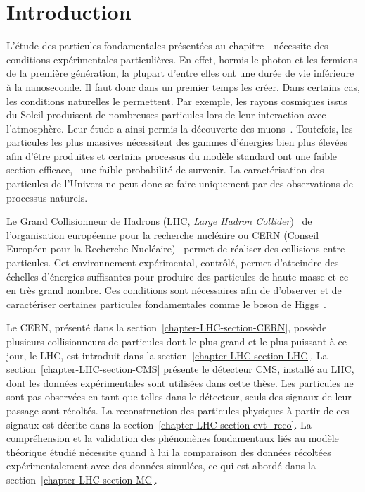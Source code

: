 \section{Introduction}\label{chapter-LHC-section-introduction}
L'étude des particules fondamentales présentées au chapitre~\ nécessite des conditions expérimentales particulières.
En effet,
hormis le photon et les fermions de la première génération,
la plupart d'entre elles ont une durée de vie inférieure à la nanoseconde.
Il faut donc dans un premier temps les créer.
Dans certains cas, les conditions naturelles le permettent.
Par exemple,
les rayons cosmiques issus du Soleil produisent de nombreuses particules lors de leur interaction avec l'atmosphère.
Leur étude a ainsi permis la découverte des muons~\cite{muon_discovery}.
Toutefois,
les particules les plus massives nécessitent des gammes d'énergies bien plus élevées afin d'être produites
et
certains processus du modèle standard ont une faible section efficace, \ie\ une faible probabilité de survenir.
La caractérisation des particules de l'Univers ne peut donc se faire uniquement par des observations de processus naturels.
\par Le Grand Collisionneur de Hadrons (LHC, \emph{Large Hadron Collider})~\cite{LHC_paper1,LHC_paper2,LHC_paper3} de l'organisation européenne pour la recherche nucléaire ou CERN (Conseil Européen pour la Recherche Nucléaire)~\cite{CERN_website} permet de réaliser des collisions entre particules.
Cet environnement expérimental, contrôlé, permet d'atteindre des échelles d'énergies suffisantes pour produire des particules de haute masse et ce en très grand nombre.
Ces conditions sont nécessaires afin de d'observer et de caractériser certaines particules fondamentales comme le boson de Higgs~\cite{ATLAS_Higgs_discovery,CMS_Higgs_discovery,CMS_Higgs_discovery_2013,ATLAS-CMS-Higgs_combined_1,ATLAS-CMS-Higgs_combined_2}.
\par Le CERN, présenté dans la section~\ref{chapter-LHC-section-CERN},
possède plusieurs collisionneurs de particules dont
le plus grand et le plus puissant à ce jour, le LHC, est introduit dans la section~\ref{chapter-LHC-section-LHC}.
La section~\ref{chapter-LHC-section-CMS} présente le détecteur CMS, installé au LHC, dont les données expérimentales sont utilisées dans cette thèse.
Les particules ne sont pas observées en tant que telles dans le détecteur,
seuls des signaux de leur passage sont récoltés.
La reconstruction des particules physiques à partir de ces signaux est décrite dans la section~\ref{chapter-LHC-section-evt_reco}.
La compréhension et la validation des phénomènes fondamentaux liés au modèle théorique étudié nécessite quand à lui la comparaison des données récoltées expérimentalement avec des données simulées, ce qui est abordé dans la section~\ref{chapter-LHC-section-MC}.